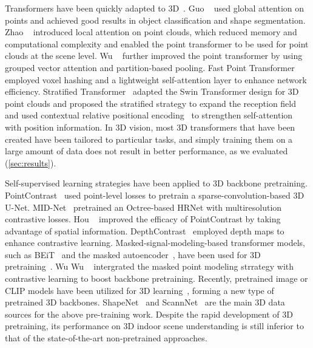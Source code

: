\documentclass[10pt,twocolumn,letterpaper]{article}
\begin{document}
 Transformers have been quickly adapted to 3D~\cite{lahoud20223d}. Guo \etal~\cite{guo2021pct} used global attention on points and achieved good results in object classification and shape segmentation. Zhao \etal~\cite{zhao2021point} introduced local attention on point clouds, which reduced memory and computational complexity and enabled the point transformer to be used for point clouds at the scene level. Wu \etal~\cite{wu2022point} further improved the point transformer by using grouped vector attention and partition-based pooling. Fast Point Transformer~\cite{park2022fast} employed voxel hashing and a lightweight self-attention layer to enhance network efficiency. Stratified Transformer~\cite{lai2022stratified} adapted the Swin Transformer design for 3D point clouds and proposed the stratified strategy to expand the reception field and used contextual relative positional encoding~\cite{wu2021rethinking} to strengthen self-attention with position information. In 3D vision, most 3D transformers that have been created have been tailored to particular tasks, and simply training them on a large amount of data does not result in better performance, as we evaluated (\cref{sec:results}).


 Self-supervised learning strategies have been applied to 3D backbone pretraining. PointContrast~\cite{Xie2020} used point-level losses to pretrain a sparse-convolution-based 3D U-Net. MID-Net~\cite{Wang2020a} pretrained an Octree-based HRNet with multiresolution contrastive losses. Hou \etal~\cite{hou2020efficient} improved the efficacy of PointContrast by taking advantage of spatial information. DepthContrast~\cite{zhang2021self} employed depth maps to enhance contrastive learning. Masked-signal-modeling-based transformer models, such as BEiT~\cite{bao2022beit} and the masked autoencoder~\cite{HeCXLDG22}, have been used for 3D pretraining~\cite{Liu2022maskdis,zhang2022point,Yu_2022_CVPR,Pang2022MaskedAF}.  Wu Wu \etal ~ intergrated the masked point modeling strrategy with contrastive learning to boost backbone pretraining. Recently, pretrained image or CLIP models have been utilized for 3D learning~\cite{wang2022p2p,dong2022autoencoders,huang2022clip2point,huang2022frozen}, forming a new type of pretrained 3D backbones. ShapeNet~\cite{shapenet2015} and ScannNet~\cite{dai2017scannet} are the main 3D data sources for the above pre-training work. Despite the rapid development of 3D pretraining, its performance on 3D indoor scene understanding is still inferior to that of the state-of-the-art non-pretrained approaches.
\end{document}
